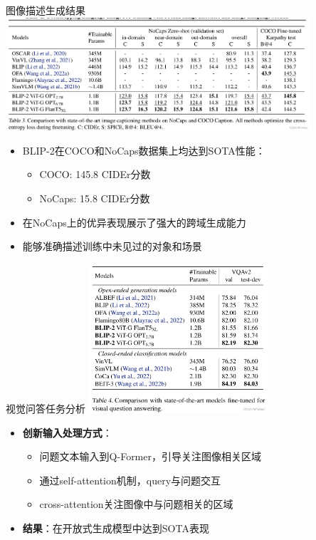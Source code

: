 \documentclass{beamer}
\begin{document}
  \begin{frame}{图像描述生成结果}
    \centering
    \includegraphics[width=0.85\textwidth]{table5.png}
    \vspace{0.2cm}
    
    \begin{itemize}
      \item BLIP-2在COCO和NoCaps数据集上均达到SOTA性能：
        \begin{itemize}
          \item COCO: 145.8 CIDEr分数
          \item NoCaps: 15.8 CIDEr分数
        \end{itemize}
      \item 在NoCaps上的优异表现展示了强大的跨域生成能力
      \item 能够准确描述训练中未见过的对象和场景
    \end{itemize}
  \end{frame}
  
  \begin{frame}{视觉问答任务分析}
    \centering
    \includegraphics[width=0.5\textwidth]{table6.png}
    \vspace{0.2cm}
    
    \begin{itemize}
      \item \textbf{创新输入处理方式}：
        \begin{itemize}
          \item 问题文本输入到Q-Former，引导关注图像相关区域
          \item 通过self-attention机制，query与问题交互
          \item cross-attention关注图像中与问题相关的区域
        \end{itemize}
      \item \textbf{结果}：在开放式生成模型中达到SOTA表现
    \end{itemize}
  \end{frame}
  
\end{document}
